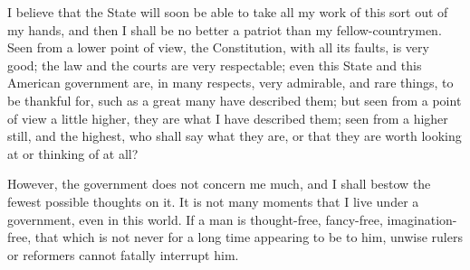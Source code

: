 \documentclass[letterpaper,12pt,english]{sphinxmanual}
\begin{document}
I believe that the State will soon be able to take all my work of this sort out of my hands, and then I shall be no better a patriot than my fellow-countrymen. Seen from a lower point of view, the Constitution, with all its faults, is very good; the law and the courts are very respectable; even this State and this American government are, in many respects, very admirable, and rare things, to be thankful for, such as a great many have described them; but seen from a point of view a little higher, they are what I have described them; seen from a higher still, and the highest, who shall say what they are, or that they are worth looking at or thinking of at all?

However, the government does not concern me much, and I shall bestow the fewest possible thoughts on it. It is not many moments that I live under a government, even in this world. If a man is thought-free, fancy-free, imagination-free, that which is not never for a long time appearing to be to him, unwise rulers or reformers cannot fatally interrupt him.
\end{document}
